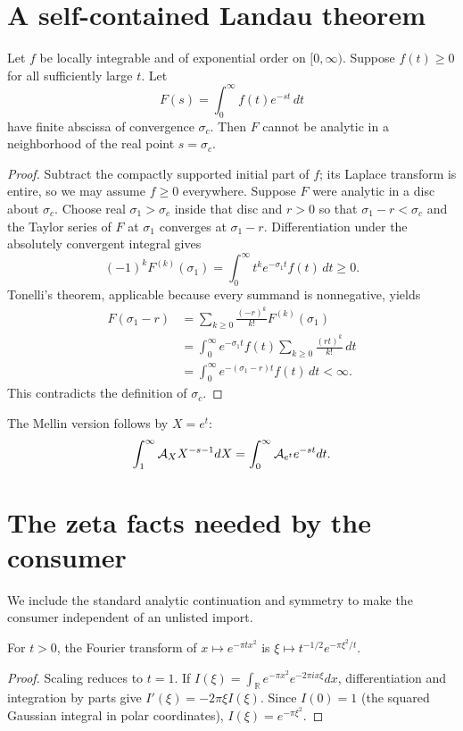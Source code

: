 \section{A self-contained Landau theorem}

\begin{theorem}\label{thm:Landau}
Let $f$ be locally integrable and of exponential order on $[0,\infty)$.  Suppose
$f(t)\ge0$ for all sufficiently large $t$.  Let
\[
 F(s)=\int_0^\infty f(t)e^{-st}\,dt
\]
have finite abscissa of convergence $\sigma_c$.  Then $F$ cannot be analytic
in a neighborhood of the real point $s=\sigma_c$.
\end{theorem}
\begin{proof}
Subtract the compactly supported initial part of $f$; its Laplace transform is
entire, so we may assume $f\ge0$ everywhere.  Suppose $F$ were analytic in a
disc about $\sigma_c$.  Choose real $\sigma_1>\sigma_c$ inside that disc and
$r>0$ so that $\sigma_1-r<\sigma_c$ and the Taylor series of $F$ at
$\sigma_1$ converges at $\sigma_1-r$.  Differentiation under the absolutely
convergent integral gives
\[
 (-1)^kF^{(k)}(\sigma_1)=\int_0^\infty t^ke^{-\sigma_1t}f(t)\,dt\ge0.
\]
Tonelli's theorem, applicable because every summand is nonnegative, yields
\begin{align*}
 F(\sigma_1-r)
 &=\sum_{k\ge0}\frac{(-r)^k}{k!}F^{(k)}(\sigma_1)\\
 &=\int_0^\infty e^{-\sigma_1t}f(t)
       \sum_{k\ge0}\frac{(rt)^k}{k!}\,dt\\
 &=\int_0^\infty e^{-(\sigma_1-r)t}f(t)\,dt<\infty.
\end{align*}
This contradicts the definition of $\sigma_c$.
\end{proof}

The Mellin version follows by $X=e^t$:
\[
 \int_1^\infty \mathcal A_X X^{-s-1}dX
 =\int_0^\infty \mathcal A_{e^t}e^{-st}dt.
\]

\section{The zeta facts needed by the consumer}

We include the standard analytic continuation and symmetry to make the
consumer independent of an unlisted import.

\begin{lemma}
For $t>0$, the Fourier transform of $x\mapsto e^{-\pi tx^2}$ is
$\xi\mapsto t^{-1/2}e^{-\pi\xi^2/t}$.
\end{lemma}
\begin{proof}
Scaling reduces to $t=1$.  If
$I(\xi)=\int_{\mathbb R}e^{-\pi x^2}e^{-2\pi i x\xi}dx$, differentiation and
integration by parts give $I'(\xi)=-2\pi\xi I(\xi)$.  Since
$I(0)=1$ (the squared Gaussian integral in polar coordinates),
$I(\xi)=e^{-\pi\xi^2}$.
\end{proof}

